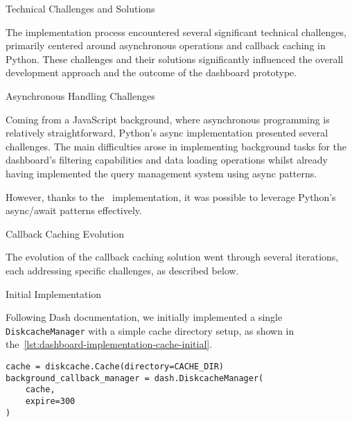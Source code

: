 \begin{section}{Technical Challenges and Solutions}
	\label{sec:implementation-technical-challenges}

	The implementation process encountered several significant technical challenges, primarily centered around asynchronous operations and callback caching in Python.
	These challenges and their solutions significantly influenced the overall development approach and the outcome of the dashboard prototype.

	\begin{subsection}{Asynchronous Handling Challenges}
		\label{subsec:implementation-technical-challenges-async}

		Coming from a JavaScript background, where asynchronous programming is relatively straightforward\cite{node.js_asynchronous_work_javascript_asynchronous_programming_and_callbacks}, Python's async implementation presented several challenges.
		The main difficulties arose in implementing background tasks for the dashboard's filtering capabilities and data loading operations whilst already having implemented the query management system using async patterns.

		However, thanks to the~ implementation, it was possible to leverage Python's async/await patterns effectively.
	\end{subsection}

	\begin{subsection}{Callback Caching Evolution}
		\label{subsec:implementation-technical-challenges-caching}

		The evolution of the callback caching solution went through several iterations, each addressing specific challenges, as described below.

		\begin{subsubsection}{Initial Implementation}
			\label{subsubsec:implementation-technical-challenges-caching-initial}

			Following Dash documentation\cite{plotly_dash_plotly_com_background_callbacks}, we initially implemented a single \texttt{DiskcacheManager} with a simple cache directory setup,
			as shown in the~\autoref{lst:dashboard-implementation-cache-initial}.

			\begin{listing}[H]
				\caption{Initial Cache Manager Setup}
				\begin{verbatim}
cache = diskcache.Cache(directory=CACHE_DIR)
background_callback_manager = dash.DiskcacheManager(
    cache,
    expire=300
)
				\end{verbatim}
				\label{lst:dashboard-implementation-cache-initial}
			\end{listing}


\end{subsubsection}
\end{subsection}
\end{section}
